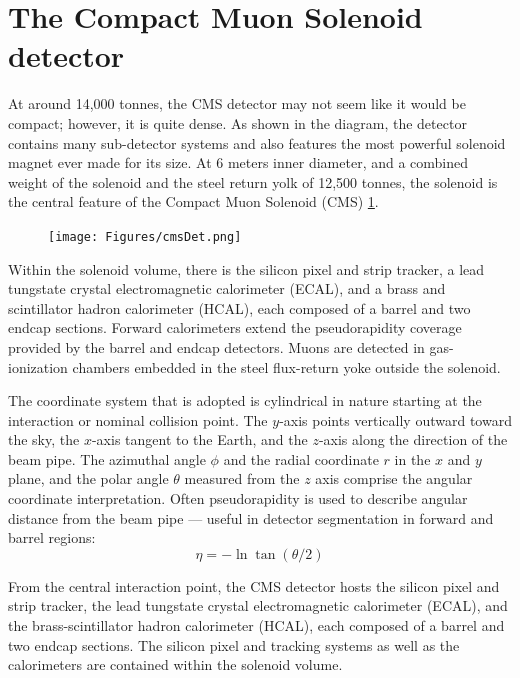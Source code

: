 \section{The Compact Muon Solenoid detector}
At around 14,000 tonnes, the CMS detector may not seem like it would be compact; however, it is quite dense. As shown in the diagram, the detector contains many sub-detector systems and also features the most powerful solenoid magnet ever made for its size. At 6 meters inner diameter, and a combined weight of the solenoid and the steel return yolk of 12,500 tonnes, the solenoid is the central feature of the Compact Muon Solenoid (CMS) \ref{fig:cmsdet}.
\begin{figure}[!htb]
\begin{center}
\texttt{[image: Figures/cmsDet.png]}
\label{fig:cmsdet}
\end{center}
\end{figure}
 Within the solenoid volume, there is the
silicon pixel and strip tracker, a lead tungstate crystal 
electromagnetic calorimeter (ECAL), and a brass and scintillator 
hadron calorimeter (HCAL), each composed of a barrel and two endcap 
sections. Forward calorimeters extend the pseudorapidity 
coverage provided by the barrel and endcap detectors. 
Muons are detected in gas-ionization chambers embedded 
in the steel flux-return yoke outside the solenoid.

The coordinate system that is adopted is cylindrical in nature starting at the interaction or nominal collision point. The $y$-axis points vertically outward toward the sky, the $x$-axis tangent to the Earth, and the $z$-axis along the direction of the beam pipe. The azimuthal angle $\phi$ and the radial coordinate $r$ in the $x$ and $y$ plane, and the polar angle $\theta$ measured from the $z$ axis comprise the angular coordinate interpretation. Often pseudorapidity is used to describe angular distance from the beam pipe --- useful in detector segmentation in forward and barrel regions:
\[\eta = - \ln \tan(\theta/2)\]  


From the central interaction point, the CMS detector hosts
the silicon pixel and strip tracker, the lead tungstate crystal electromagnetic
calorimeter (ECAL), and the brass-scintillator hadron calorimeter (HCAL),
each composed of a barrel and two endcap sections. The silicon pixel and tracking systems as well as
the calorimeters are contained within the solenoid volume.  %


